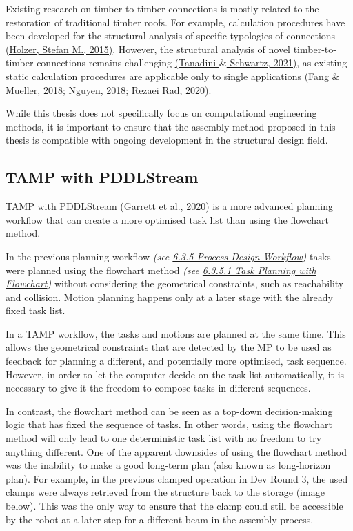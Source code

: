 Existing research on timber-to-timber connections is mostly related to the restoration of traditional timber roofs. For example, calculation procedures have been developed for the structural analysis of specific typologies of connections \href{https://www.zotero.org/google-docs/?QbdDj9}{(Holzer, Stefan M., 2015)}. However, the structural analysis of novel timber-to-timber connections remains challenging \href{https://www.zotero.org/google-docs/?k50oK1}{(Tanadini $\&$ Schwartz, 2021)}, as existing static calculation procedures are applicable only to single applications \href{https://www.zotero.org/google-docs/?4OYa3q}{(Fang $\&$ Mueller, 2018; Nguyen, 2018; Rezaei Rad, 2020)}. 

While this thesis does not specifically focus on computational engineering methods, it is important to ensure that the assembly method proposed in this thesis is compatible with ongoing development in the structural design field.

\subsection{TAMP with PDDLStream}

TAMP with PDDLStream \href{https://www.zotero.org/google-docs/?nU79EO}{(Garrett et al., 2020)} is a more advanced planning workflow that can create a more optimised task list than using the flowchart method.

In the previous planning workflow \textit{(see \uline{6.3.5 Process Design Workflow})} tasks were planned using the flowchart method \textit{(see \uline{6.3.5.1 Task Planning with Flowchart})} without considering the geometrical constraints, such as reachability and collision. Motion planning happens only at a later stage with the already fixed task list. 

In a TAMP workflow, the tasks and motions are planned at the same time. This allows the geometrical constraints that are detected by the MP to be used as feedback for planning a different, and potentially more optimised, task sequence. However, in order to let the computer decide on the task list automatically, it is necessary to give it the freedom to compose tasks in different sequences. 

In contrast, the flowchart method can be seen as a top-down decision-making logic that has fixed the sequence of tasks. In other words, using the flowchart method will only lead to one deterministic task list with no freedom to try anything different. One of the apparent downsides of using the flowchart method was the inability to make a good long-term plan (also known as long-horizon plan). For example, in the previous clamped operation in Dev Round 3, the used clamps were always retrieved from the structure back to the storage (image below). This was the only way to ensure that the clamp could still be accessible by the robot at a later step for a different beam in the assembly process. 

